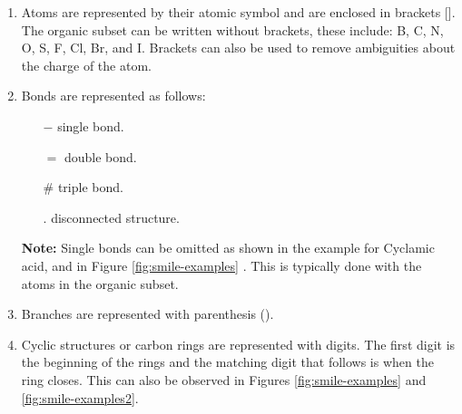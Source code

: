         \begin{enumerate}
            \item Atoms are represented by their atomic symbol and are enclosed in brackets []. The organic subset can be written without brackets, these include: B, C, N, O, S, F, Cl, Br, and I. Brackets can also be used to remove ambiguities about the charge of the atom. 
            \item Bonds are represented as follows: 
            \begin{itemize}
                \item[$-$] single bond.
                \item[$=$] double bond.
                \item[$\#$] triple bond.
                \item[$.$] disconnected structure.
            \end{itemize}
            \textbf{Note:} Single bonds can be omitted as shown in the example for  Cyclamic acid, and in Figure \ref{fig:smile-examples} .  This is typically done with the atoms in the organic subset.  %
            \item Branches are represented with parenthesis ().
            \item Cyclic structures or carbon rings are represented with digits. The first digit is the beginning of the rings and the matching digit that follows is when the ring closes. This can also be observed in Figures \ref{fig:smile-examples} and \ref{fig:smile-examples2}.
        \end{enumerate}
